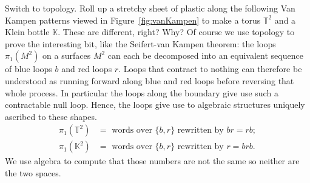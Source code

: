 Switch to topology.   Roll up a stretchy sheet of plastic along the following 
Van Kampen patterns  viewed in Figure~\ref{fig:vanKampen} to make a torus $\mathbb{T}^2$ 
and a Klein bottle $\mathbb{K}$.  These are different, right?  Why?  Of course we use topology 
to prove the interesting bit, like the Seifert-van Kampen theorem: the loops 
$\pi_1(M^2)$ on a surfaces $M^2$ can each be decomposed into an equivalent sequence of blue loops $b$ and red loops $r$.
Loops that contract to nothing can therefore be understood as running forward
along blue and red loops before reversing that whole process.  In particular
the loops along the boundary give use such a contractable null loop.  Hence,
the loops give use to algebraic structures uniquely ascribed to these shapes.
\begin{align*}
    \pi_1(\mathbb{T}^2) &= \text{ words over }\{b,r\} \text{ rewritten by }br=rb;
    \\
    \pi_1(\mathbb{K}^2) &= \text{ words over }\{b,r\} \text{ rewritten by } r=brb. 
\end{align*}
We use algebra to compute that those numbers are not the same so neither are the two spaces.
